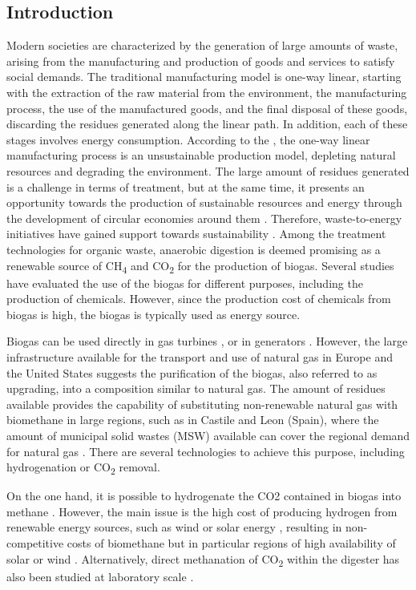 \begin{refsection}[referencesCh7]
\section{Introduction}
Modern societies are characterized by the generation of large amounts of waste, arising from the manufacturing and production of goods and services to satisfy social demands. The traditional manufacturing model is one-way linear, starting with the extraction of the raw material from the environment, the manufacturing process, the use of the manufactured goods, and the final disposal of these goods, discarding the residues generated along the linear path. In addition, each of these stages involves energy consumption. According to the \citet{WCED1987}, the one-way linear manufacturing process is an unsustainable production model, depleting natural resources and degrading the environment. The large amount of residues generated is a challenge in terms of treatment, but at the same time, it presents an opportunity towards the production of sustainable resources and energy through the development of circular economies around them \citep{WorldEnergyCouncil2016}. Therefore, waste-to-energy initiatives have gained support towards sustainability \citep{korhonen2018circular}. Among the treatment technologies for organic waste, anaerobic digestion is deemed promising as a renewable source of CH\textsubscript{4} and CO\textsubscript{2} for the production of biogas. Several studies have evaluated the use of the biogas for different purposes, including the production of chemicals. However, since the production cost of chemicals from biogas is high, the biogas is typically used as energy source.

Biogas can be used directly in gas turbines \citep{somehsaraei2014performance}, or in generators \citep{reddy2016investigation}. However, the large infrastructure available for the transport and use of natural gas in Europe \citep{Entsog} and the United States \citep{EIAPipelines} suggests the purification of the biogas, also referred to as upgrading, into a composition similar to natural gas. The amount of residues available provides the capability of substituting non-renewable natural gas with biomethane in large regions, such as in Castile and Leon (Spain), where the amount of municipal solid wastes (MSW) available can cover the regional demand for natural gas \citep{taifouris2018multiscale}. There are several technologies to achieve this purpose, including hydrogenation or CO\textsubscript{2} removal.

On the one hand, it is possible to hydrogenate the CO2 contained in biogas into methane \citep{stangeland2017co2}. However, the main issue is the high cost of producing hydrogen from renewable energy sources, such as wind \citep{davis2014optimala} or solar energy \citep{davis2014optimalb}, resulting in non-competitive costs of biomethane \citep{curto2019renewable} but in particular regions of high availability of solar or wind \citep{de2016characterization}. Alternatively, direct methanation of CO\textsubscript{2} within the digester has also been studied at laboratory scale \citep{Tynjala}.


\end{refsection}
